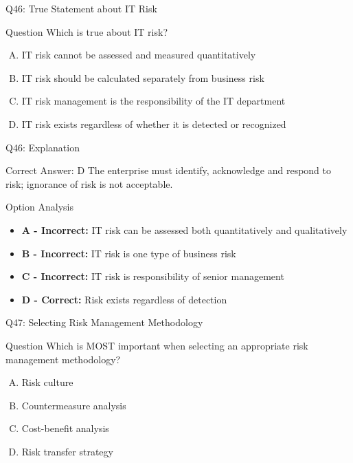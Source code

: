 \documentclass{beamer}
\begin{document}
	\begin{frame}{Q46: True Statement about IT Risk}
		\begin{block}{Question}
			Which is true about IT risk?
		\end{block}
		\begin{enumerate}[(A)]
			\item IT risk cannot be assessed and measured quantitatively
			\item IT risk should be calculated separately from business risk
			\item IT risk management is the responsibility of the IT department
			\item IT risk exists regardless of whether it is detected or recognized
		\end{enumerate}
	\end{frame}
	
	\begin{frame}{Q46: Explanation}
		\begin{block}{Correct Answer: D}
			The enterprise must identify, acknowledge and respond to risk; ignorance of risk is not acceptable.
		\end{block}
		\begin{block}{Option Analysis}
			\begin{itemize}
				\item \textbf{A - Incorrect:} IT risk can be assessed both quantitatively and qualitatively
				\item \textbf{B - Incorrect:} IT risk is one type of business risk
				\item \textbf{C - Incorrect:} IT risk is responsibility of senior management
				\item \textbf{D - Correct:} Risk exists regardless of detection
			\end{itemize}
		\end{block}
	\end{frame}
	
	\begin{frame}{Q47: Selecting Risk Management Methodology}
		\begin{block}{Question}
			Which is MOST important when selecting an appropriate risk management methodology?
		\end{block}
		\begin{enumerate}[(A)]
			\item Risk culture
			\item Countermeasure analysis
			\item Cost-benefit analysis
			\item Risk transfer strategy
		\end{enumerate}
	\end{frame}
	
\end{document}
